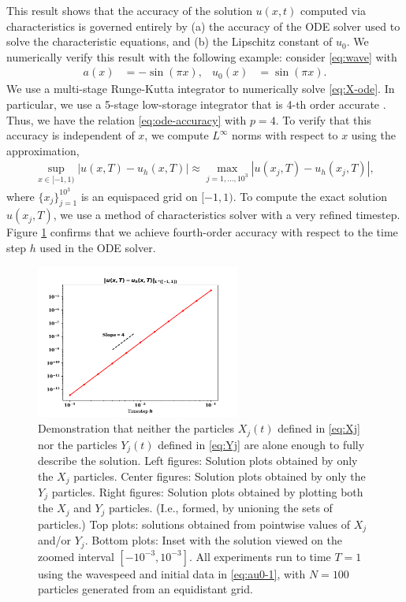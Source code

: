 \documentclass[11pt]{amsart}
\begin{document}
  This result shows that the accuracy of the solution $u(x,t)$ computed via characteristics is governed entirely by (a) the accuracy of the ODE solver used to solve the characteristic equations, and (b) the Lipschitz constant of $u_0$. We numerically verify this result with the following example: consider \eqref{eq:wave} with 
  \begin{align*}
    a(x) &= -\sin(\pi x), & u_0(x) &= \sin(\pi x).
  \end{align*}
  We use a multi-stage Runge-Kutta integrator to numerically solve \eqref{eq:X-ode}. In particular, we use a 5-stage low-storage integrator that is 4-th order accurate \cite{carpenter-kennedy-lserk}. Thus, we have the relation \eqref{eq:ode-accuracy} with $p = 4$. To verify that this accuracy is independent of $x$, we compute $L^\infty$ norms with respect to $x$ using the approximation,
  \begin{align*}
    \sup_{x \in [-1,1)} | u(x,T) - u_h(x,T) | \approx \max_{j=1, \ldots, 10^3} |u(x_j,T) - u_h(x_j,T)|,
  \end{align*}
  where $\{x_j\}_{j=1}^{10^3}$ is an equispaced grid on $[-1,1)$. To compute the exact solution $u(x_j,T)$, we use a method of characteristics solver with a very refined timestep.  Figure \ref{fig:f2} confirms that we achieve fourth-order accuracy with respect to the time step $h$ used in the ODE solver. 
\begin{figure}
  \begin{center}
  \includegraphics[width=0.6\textwidth]{convergence-plot.pdf}
  \end{center}
  \caption{Demonstration that neither the particles $X_j(t)$ defined in \eqref{eq:Xj} nor the particles $Y_j(t)$ defined in \eqref{eq:Yj} are alone enough to fully describe the solution. Left figures: Solution plots obtained by only the $X_j$ particles. Center figures: Solution plots obtained by only the $Y_j$ particles. Right figures: Solution plots obtained by plotting both the $X_j$ and $Y_j$ particles. (I.e., formed, by unioning the sets of particles.) Top plots: solutions obtained from pointwise values of $X_j$ and/or $Y_j$. Bottom plots: Inset with the solution viewed on the zoomed interval $[-10^{-3}, 10^{-3}]$. All experiments run to time $T = 1$ using the wavespeed and initial data in \eqref{eq:au0-1}, with $N = 100$ particles generated from an equidistant grid.}\label{fig:f2}
\end{figure}



\end{document}
